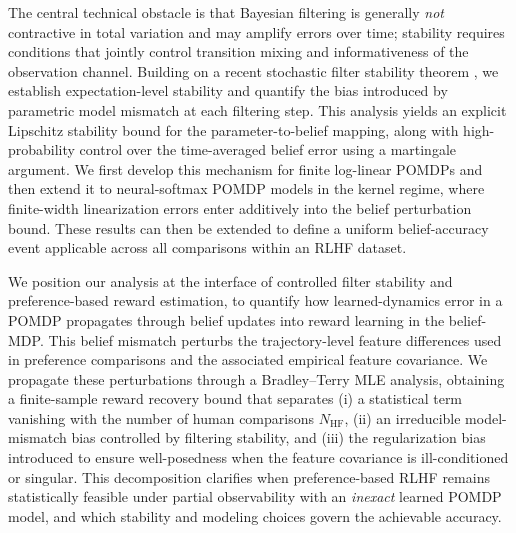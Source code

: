 \documentclass[10pt]{article} %
\theoremstyle{plain}
\theoremstyle{definition}
\theoremstyle{remark}
\begin{document}
The central technical obstacle is that Bayesian filtering is generally \emph{not} contractive in total variation and may amplify errors over time; stability requires conditions that jointly control transition mixing and informativeness of the observation channel. Building on a recent stochastic filter stability theorem \cite{Mcdonald2024StochasticCriteria}, we establish expectation-level stability and quantify the bias introduced by parametric model mismatch at each filtering step. This analysis yields an explicit Lipschitz stability bound for the parameter-to-belief mapping, along with high-probability control over the time-averaged belief error using a martingale argument. We first develop this mechanism for finite log-linear POMDPs and then extend it to neural-softmax POMDP models in the kernel regime, where finite-width linearization errors enter additively into the belief perturbation bound. These results can then be extended to define a uniform belief-accuracy event applicable across all comparisons within an RLHF dataset.

We position our analysis at the interface of controlled filter stability and preference-based reward estimation, to quantify how learned-dynamics error in a POMDP propagates through belief updates into reward learning in the belief-MDP. This belief mismatch perturbs the trajectory-level feature differences used in preference comparisons and the associated empirical feature covariance. We propagate these perturbations through a Bradley--Terry MLE analysis, obtaining a finite-sample reward recovery bound that separates (i) a statistical term vanishing with the number of human comparisons $N_{\mathrm{HF}}$, (ii) an irreducible model-mismatch bias controlled by filtering stability, and (iii) the regularization bias introduced to ensure well-posedness when the feature covariance is ill-conditioned or singular. This decomposition clarifies when preference-based RLHF remains statistically feasible under partial observability with an \emph{inexact} learned POMDP model, and which stability and modeling choices govern the achievable accuracy.
\end{document}
